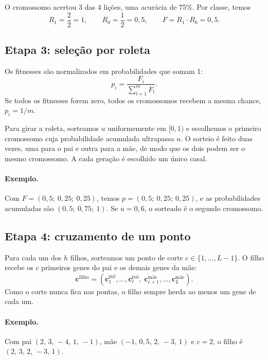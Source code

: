 \documentclass[11pt,a4paper]{article}
\newcommand{\cromo}{\mathbf{c}}
\begin{document}
O cromossomo acertou 3 das 4 lições, uma acurácia de 75\%. Por classe, temos
\begin{equation*}
  R_1 = \frac{2}{2} = 1, \qquad R_0 = \frac{1}{2} = 0{,}5, \qquad
  F = R_1 \cdot R_0 = 0{,}5.
\end{equation*}

\subsection*{Etapa 3: seleção por roleta}

Os fitnesses são normalizados em probabilidades que somam 1:
\begin{equation}
  p_i = \frac{F_i}{\sum_{l=1}^{m} F_l}.
\end{equation}
Se todos os fitnesses forem zero, todos os cromossomos recebem a mesma chance,
$p_i = 1/m$.

Para girar a roleta, sorteamos $u$ uniformemente em $[0, 1)$ e escolhemos o primeiro
cromossomo cuja probabilidade acumulada ultrapassa $u$. O sorteio é feito duas vezes,
uma para o pai e outra para a mãe, de modo que os dois podem ser o mesmo cromossomo. A
cada geração é escolhido um único casal.

\paragraph{Exemplo.} Com $F = (0{,}5;\ 0{,}25;\ 0{,}25)$, temos
$p = (0{,}5;\ 0{,}25;\ 0{,}25)$, e as probabilidades acumuladas são
$(0{,}5;\ 0{,}75;\ 1)$. Se $u = 0{,}6$, o sorteado é o segundo cromossomo.

\subsection*{Etapa 4: cruzamento de um ponto}

Para cada um dos $h$ filhos, sorteamos um ponto de corte $c \in \{1, \dots, L-1\}$. O
filho recebe os $c$ primeiros genes do pai e os demais genes da mãe:
\begin{equation}
  \cromo^{\text{filho}} =
  (\cromo^{\text{pai}}_{1}, \dots, \cromo^{\text{pai}}_{c},\;
   \cromo^{\text{mãe}}_{c+1}, \dots, \cromo^{\text{mãe}}_{L}).
\end{equation}
Como o corte nunca fica nas pontas, o filho sempre herda ao menos um gene de cada um.

\paragraph{Exemplo.} Com pai $(2,\, 3,\, -4,\, 1,\, -1)$, mãe $(-1,\, 0{,}5,\, 2,\, -3,\, 1)$
e $c = 2$, o filho é $(2,\, 3,\, 2,\, -3,\, 1)$.
\end{document}
